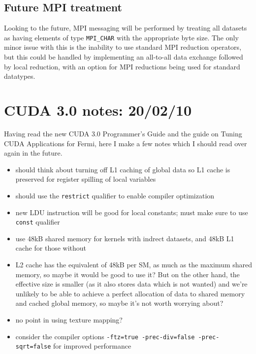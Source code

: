 \documentclass[12pt]{article}
\begin{document}
\subsection{Future MPI treatment}

Looking to the future, MPI messaging will be performed by treating all 
datasets as having elements of type {\tt MPI\_CHAR} with the appropriate
byte size.  The only minor issue with this is the inability to use 
standard MPI reduction operators, but this could be handled by
implementing an all-to-all data exchange followed by local reduction,
with an option for MPI reductions being used for standard datatypes.


\newpage

\section{CUDA 3.0 notes: 20/02/10}

Having read the new CUDA 3.0 Programmer's Guide and the guide on
Tuning CUDA Applications for Fermi, here I make a few notes which 
I should read over again in the future.

\begin{itemize}
\item
should think about turning off L1 caching of global data so L1 cache is 
preserved for register spilling of local variables

\item
should use the {\tt restrict} qualifier to enable compiler optimization

\item
new LDU instruction will be good for local constants; must make sure to use
{\tt const} qualifier

\item
use 48kB shared memory for kernels with indrect datasets, and
48kB L1 cache for those without

\item
L2 cache has the equivalent of 48kB per SM, as much as the maximum 
shared memory, so maybe it would be good to use it?  But on the other 
hand, the effective size is smaller (as it also stores data which is 
not wanted) and we're unlikely to be able to achieve a perfect 
allocation of data to shared memory and cached global memory, so 
maybe it's not worth worrying about?

\item
no point in using texture mapping?

\item
consider the compiler options 
{\tt -ftz=true -prec-div=false -prec-sqrt=false} 
for improved performance

\end{itemize}
\end{document}
